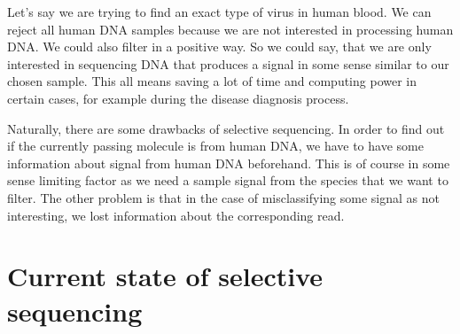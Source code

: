 Let's say we are trying to find an exact type of virus in human blood. We can
reject all human DNA samples because we are not interested in processing human
DNA. We could also filter in a positive way. So we could say, that we are only
interested in sequencing DNA that produces a signal in some sense similar to our
chosen sample. This all means saving a lot of time and computing power in certain
cases, for example during the disease diagnosis process.

Naturally, there are some drawbacks of selective sequencing. In order to find out
if the currently passing molecule is from human DNA, we have to have some information
about signal from human DNA beforehand.
This is of course in some sense limiting factor as we need a sample signal from
the species that we want to filter. The other problem is that in the case of misclassifying
some signal as not interesting, we lost information about the corresponding
read.

\section{Current state of selective sequencing}
